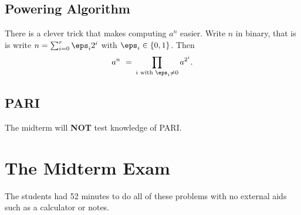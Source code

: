 \documentclass[11pt]{report}
\begin{document}
\subsection{Powering Algorithm}
There is a clever trick that makes computing $a^n$ easier.
Write $n$ in binary, that is is write $n=\sum_{i=0}^r \eps_i 2^i$
with $\eps_i \in \{0,1\}$.
Then
$$a^n \,\,=\, \prod_{\text{$i$ with }\eps_i\neq 0} a^{2^i}.$$

\subsection{PARI}
The midterm will {\bf NOT} test knowledge of PARI.


\section{The Midterm Exam}
The students had 52 minutes to do all of these
problems with no external aids such as a calculator
or notes.
\end{document}
